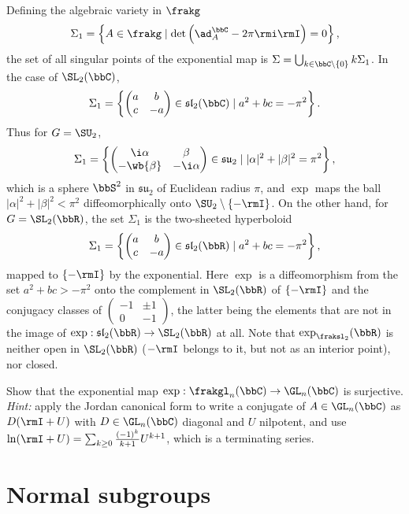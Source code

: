 \begin{example}
Defining the algebraic variety in $\frakg$
\[\Sigma_1=\left\{A\in\frakg\mid \det\left(\ad_A^\bbC -2\pi\rmi  \rmI\right)=0\right\},\]
the set of all singular points of the exponential map is $\Sigma=\bigcup_{k\in\bbC\setminus\{0\}} k\Sigma_1$. In the case of $\SL_2(\bbC)$,
\[\Sigma_1=\left\{\begin{pmatrix}
    a&b\\c&-a
\end{pmatrix}\in\mathfrak{sl}_2(\bbC)\mid a^2+bc=-\pi^2\right\}.\]
Thus for $G=\SU_2$,
\[\Sigma_1=\left\{\begin{pmatrix}
    \i\alpha&\beta\\-\wb{\beta}&-\i\alpha
\end{pmatrix}\in\mathfrak{su}_2\mid |\alpha|^2+|\beta|^2=\pi^2\right\},\]
which is a sphere $\bbS^2$ in $\mathfrak{su}_2$ of Euclidean radius $\pi$, and $\exp$ maps the ball $|\alpha|^2+|\beta|^2<\pi^2$ diffeomorphically onto $\SU_2\setminus\{-\rmI\}$. On the other hand, for $G=\SL_2(\bbR)$, the set $\Sigma_1$ is the two-sheeted hyperboloid
\[\Sigma_1=\left\{\begin{pmatrix}
    a&b\\c&-a
\end{pmatrix}\in\mathfrak{sl}_2(\bbR)\mid a^2+bc=-\pi^2\right\},\]
mapped to $\{-\rmI\}$ by the exponential. Here $\exp$ is a diffeomorphism from the set $a^2+bc>-\pi^2$ onto the complement in $\SL_2(\bbR)$ of $\{-\rmI\}$ and the conjugacy classes of $\left(\begin{smallmatrix}
    -1&\pm1\\0&-1
\end{smallmatrix}\right)$, the latter being the elements that are not in the image of $\exp:\mathfrak{sl}_2(\bbR)\to \SL_2(\bbR)$ at all. Note that $\exp_{\fraksl_2}(\bbR)$ is neither open in $\SL_2(\bbR)$ ($-\rmI$ belongs to it, but not as an interior point), nor closed.
\end{example}

\begin{xca}
    Show that the exponential map $\exp:\frakgl_n(\bbC)\to \GL_n(\bbC)$ is surjective. \emph{Hint:} apply the Jordan canonical form to write a conjugate of $A\in\GL_n(\bbC)$ as $D(\rmI+U)$ with $D\in\GL_n(\bbC)$ diagonal and $U$ nilpotent, and use $\ln(\rmI+U)=\sum_{k\geq 0} \frac{(-1)^k}{k+1}U^{k+1}$, which is a terminating series.
\end{xca}





\section{Normal subgroups}

